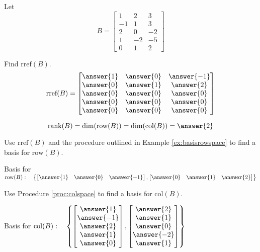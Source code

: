 \documentclass{ximera}
\begin{document}
\begin{problem} 
Let
$$B=\begin{bmatrix}1&2&3\\-1&1&3\\2&0&-2\\1&-2&-5\\0&1&2\end{bmatrix}$$

\begin{problem}\label{prob:colrowmatrixB1}
Find $\mbox{rref}(B)$.
$$\mbox{rref}(B)=\begin{bmatrix}\answer{1}&\answer{0}&\answer{-1}\\\answer{0}&\answer{1}&\answer{2}\\\answer{0}&\answer{0}&\answer{0}\\\answer{0}&\answer{0}&\answer{0}\\\answer{0}&\answer{0}&\answer{0}\end{bmatrix}$$
\end{problem}

\begin{problem}\label{prob:colrowmatrixB2}
$$\mbox{rank}(B)=\mbox{dim}(\mbox{row}(B))=\mbox{dim}(\mbox{col}(B))=\answer{2}$$
\end{problem}

\begin{problem}\label{prob:colrowmatrixB3}
Use $\mbox{rref}(B)$ and the procedure outlined in Example \ref{ex:basisrowspace} to find a basis for $\mbox{row}(B)$.

Basis for $\mbox{row}(B):\quad
\left\{\begin{bmatrix}\answer{1}& \answer{0}& \answer{-1}\end{bmatrix},\begin{bmatrix}\answer{0} & \answer{1}& \answer{2}\end{bmatrix} \right\}$
\end{problem}

\begin{problem}\label{prob:colrowmatrixB4}
Use Procedure \ref{proc:colspace} to find a basis for $\mbox{col}(B)$.

Basis for $\mbox{col}(B):\quad
\left\{ \begin{bmatrix}\answer{1}\\\answer{-1}\\\answer{2}\\\answer{1}\\\answer{0}\end{bmatrix}, \begin{bmatrix}\answer{2}\\\answer{1}\\\answer{0}\\\answer{-2}\\\answer{1}\end{bmatrix}\right\}$
\end{problem}

\end{problem}
\end{document}
